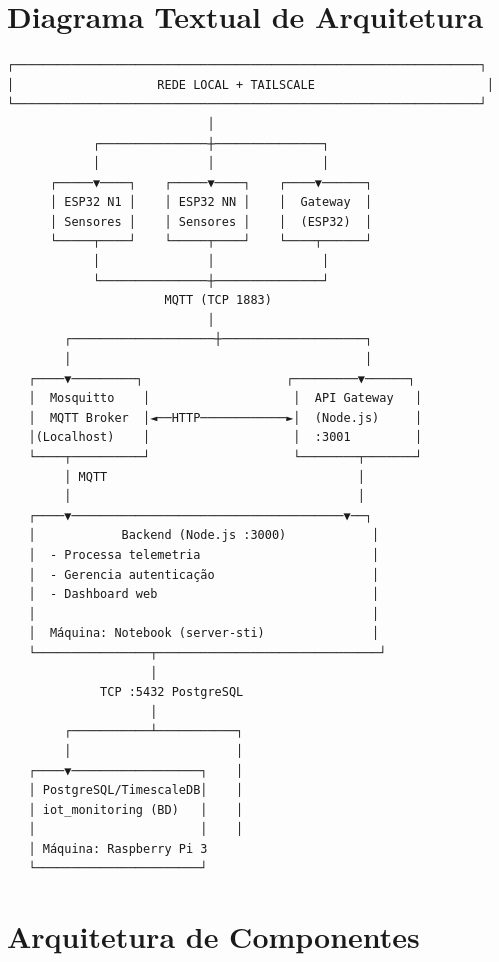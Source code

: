 \documentclass[12pt,a4paper,oneside]{report}
\begin{document}
\section{Diagrama Textual de Arquitetura}

\begin{framed}
\scriptsize
\begin{verbatim}
┌─────────────────────────────────────────────────────────────────┐
│                    REDE LOCAL + TAILSCALE                        │
└─────────────────────────────────────────────────────────────────┘
                            │
            ┌───────────────┼───────────────┐
            │               │               │
      ┌─────▼────┐    ┌─────▼────┐    ┌────▼──────┐
      │ ESP32 N1 │    │ ESP32 NN │    │  Gateway  │
      │ Sensores │    │ Sensores │    │  (ESP32)  │
      └─────┬────┘    └─────┬────┘    └────┬──────┘
            │               │               │
            └───────────────┼───────────────┘
                      MQTT (TCP 1883)
                            │
        ┌────────────────────┼────────────────────┐
        │                                         │
   ┌────▼─────────┐                    ┌─────────▼──────┐
   │  Mosquitto    │                    │  API Gateway   │
   │  MQTT Broker  │◄──HTTP────────────►│  (Node.js)     │
   │(Localhost)    │                    │  :3001         │
   └────┬──────────┘                    └────────┬───────┘
        │ MQTT                                   │
        │                                        │
   ┌────▼──────────────────────────────────────▼──┐
   │            Backend (Node.js :3000)            │
   │  - Processa telemetria                        │
   │  - Gerencia autenticação                      │
   │  - Dashboard web                              │
   │                                               │
   │  Máquina: Notebook (server-sti)               │
   └────────────────┬───────────────────────────────┘
                    │
             TCP :5432 PostgreSQL
                    │
        ┌───────────┴───────────┐
        │                       │
   ┌────▼──────────────────┐    │
   │ PostgreSQL/TimescaleDB│    │
   │ iot_monitoring (BD)   │    │
   │                       │    │
   │ Máquina: Raspberry Pi 3
   └───────────────────────┘
\end{verbatim}
\end{framed}

\section{Arquitetura de Componentes}
\end{document}
